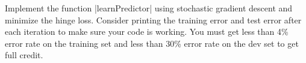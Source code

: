 \item {}

Implement the function |learnPredictor| using stochastic gradient
descent and minimize the hinge loss. Consider printing the training error and
test error after each iteration to make sure your code is working. You must get
less than 4\% error rate on the training set and less than 30\% error rate on
the dev set to get full credit.
